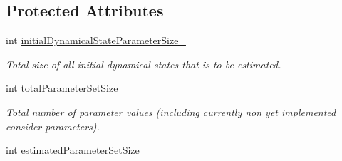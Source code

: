 \subsection*{Protected Attributes}
\begin{DoxyCompactItemize}
\item 
int \hyperlink{classtudat_1_1estimatable__parameters_1_1EstimatableParameterSet_a5e12132938b203d7ca651e4d67dfcfa1}{initial\+Dynamical\+State\+Parameter\+Size\+\_\+}\hypertarget{classtudat_1_1estimatable__parameters_1_1EstimatableParameterSet_a5e12132938b203d7ca651e4d67dfcfa1}{}\label{classtudat_1_1estimatable__parameters_1_1EstimatableParameterSet_a5e12132938b203d7ca651e4d67dfcfa1}

\begin{DoxyCompactList}\small\item\em Total size of all initial dynamical states that is to be estimated. \end{DoxyCompactList}\item 
int \hyperlink{classtudat_1_1estimatable__parameters_1_1EstimatableParameterSet_a41e418cb98a3c66773851a8bcf5ae035}{total\+Parameter\+Set\+Size\+\_\+}\hypertarget{classtudat_1_1estimatable__parameters_1_1EstimatableParameterSet_a41e418cb98a3c66773851a8bcf5ae035}{}\label{classtudat_1_1estimatable__parameters_1_1EstimatableParameterSet_a41e418cb98a3c66773851a8bcf5ae035}

\begin{DoxyCompactList}\small\item\em Total number of parameter values (including currently non yet implemented consider parameters). \end{DoxyCompactList}\item 
int \hyperlink{classtudat_1_1estimatable__parameters_1_1EstimatableParameterSet_a75e372ee0830616efc9afb50f3ab4982}{estimated\+Parameter\+Set\+Size\+\_\+}\hypertarget{classtudat_1_1estimatable__parameters_1_1EstimatableParameterSet_a75e372ee0830616efc9afb50f3ab4982}{}\label{classtudat_1_1estimatable__parameters_1_1EstimatableParameterSet_a75e372ee0830616efc9afb50f3ab4982}


\end{DoxyCompactItemize}
